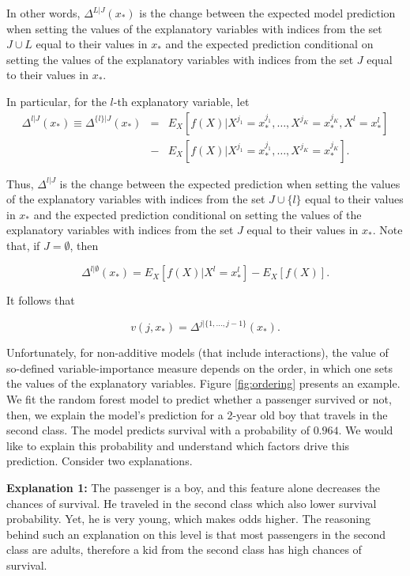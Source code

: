 \documentclass[]{krantz}
\begin{document}
In other words, \(\Delta^{L|J}(x_*)\) is the change between the expected model prediction when setting the values of the explanatory variables with indices from the set \(J \cup L\) equal to their values in \(x_*\) and the expected prediction conditional on setting the values of the explanatory variables with indices from the set \(J\) equal to their values in \(x_*\).

In particular, for the \(l\)-th explanatory variable, let
\begin{eqnarray}
\Delta^{l|J}(x_*) \equiv \Delta^{\{l\}|J}(x_*) &=& E_X[f(X) | X^{j_1} = x_*^{j_1},\ldots,X^{j_K} = x_*^{j_K}, X^{l} = x_*^{l}]\\
&-& E_X[f(X) | X^{j_1} = x_*^{j_1},\ldots,X^{j_K} = x_*^{j_K}].
\end{eqnarray}

Thus, \(\Delta^{l|J}\) is the change between the expected prediction when setting the values of the explanatory variables with indices from the set \(J \cup \{l\}\) equal to their values in \(x_*\) and the expected prediction conditional on setting the values of the explanatory variables with indices from the set \(J\) equal to their values in \(x_*\). Note that, if \(J=\emptyset\), then

\begin{equation}
\Delta^{l|\emptyset}(x_*) = E_X[f(X) | X^{l} = x_*^{l}] - E_X[f(X)].
\label{eq:deltaBreakDownAdditive}
\end{equation}

It follows that

\begin{equation}
v(j, x_*) = \Delta^{j|\{1,  ..., j-1\}}(x_*).
\end{equation}

Unfortunately, for non-additive models (that include interactions), the value of so-defined variable-importance measure depends on the order, in which one sets the values of the explanatory variables. Figure \ref{fig:ordering} presents an example.
We fit the random forest model to predict whether a passenger survived or not, then, we explain the model's prediction for a 2-year old boy that travels in the second class. The model predicts survival with a probability of \(0.964\). We would like to explain this probability and understand which factors drive this prediction. Consider two explanations.

\textbf{Explanation 1:}
The passenger is a boy, and this feature alone decreases the chances of survival. He traveled in the second class which also lower survival probability.
Yet, he is very young, which makes odds higher. The reasoning behind such an explanation on this level is that most passengers in the second class are adults, therefore a kid from the second class has high chances of survival.
\end{document}

